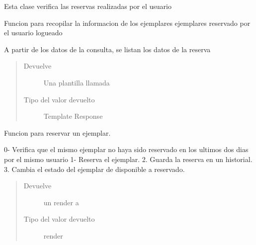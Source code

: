 \documentclass[letterpaper,10pt,spanish]{sphinxmanual}
\begin{document}
\begin{fulllineitems}
\label{\detokenize{modules/reserva/views:reserva.views.ReservaLibros}}
Esta clase verifica las reservas realizadas por el usuario

\begin{fulllineitems}
\label{\detokenize{modules/reserva/views:reserva.views.ReservaLibros.get}}
Funcion para recopilar la informacion de los ejemplares ejemplares reservado por el usuario logueado

A partir de los datos de la consulta, se listan los datos de la reserva
\begin{quote}\begin{description}
\item[{Devuelve}] \leavevmode
Una plantilla llamada 

\item[{Tipo del valor devuelto}] \leavevmode
Template Response

\end{description}\end{quote}

\end{fulllineitems}


\end{fulllineitems}


\begin{fulllineitems}
\label{\detokenize{modules/reserva/views:reserva.views.Reservar}}
Funcion para reservar un ejemplar.

0- Verifica que el mismo ejemplar no haya sido reservado en los ultimos dos dias por el mismo usuario
1- Reserva el ejemplar.
2. Guarda la reserva en un historial.
3. Cambia el estado del ejemplar de disponible a reservado.
\begin{quote}\begin{description}
\item[{Devuelve}] \leavevmode
un render a 

\item[{Tipo del valor devuelto}] \leavevmode
render

\end{description}\end{quote}

\end{fulllineitems}
\end{document}
